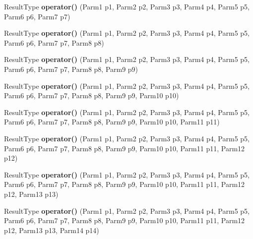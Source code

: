 \begin{DoxyCompactItemize}
\item 
\hypertarget{classLoki_1_1BinderFirst_aba5f845b35044aa6acda02d3429e3ca6}{}Result\+Type {\bfseries operator()} (Parm1 p1, Parm2 p2, Parm3 p3, Parm4 p4, Parm5 p5, Parm6 p6, Parm7 p7)\label{classLoki_1_1BinderFirst_aba5f845b35044aa6acda02d3429e3ca6}

\item 
\hypertarget{classLoki_1_1BinderFirst_ad43e3ee99fa6d9a8243b00c9eeedb912}{}Result\+Type {\bfseries operator()} (Parm1 p1, Parm2 p2, Parm3 p3, Parm4 p4, Parm5 p5, Parm6 p6, Parm7 p7, Parm8 p8)\label{classLoki_1_1BinderFirst_ad43e3ee99fa6d9a8243b00c9eeedb912}

\item 
\hypertarget{classLoki_1_1BinderFirst_a5f30ee929061b055d347fb8ded0df847}{}Result\+Type {\bfseries operator()} (Parm1 p1, Parm2 p2, Parm3 p3, Parm4 p4, Parm5 p5, Parm6 p6, Parm7 p7, Parm8 p8, Parm9 p9)\label{classLoki_1_1BinderFirst_a5f30ee929061b055d347fb8ded0df847}

\item 
\hypertarget{classLoki_1_1BinderFirst_a8cd2e1a523c41198f12e544c1380673e}{}Result\+Type {\bfseries operator()} (Parm1 p1, Parm2 p2, Parm3 p3, Parm4 p4, Parm5 p5, Parm6 p6, Parm7 p7, Parm8 p8, Parm9 p9, Parm10 p10)\label{classLoki_1_1BinderFirst_a8cd2e1a523c41198f12e544c1380673e}

\item 
\hypertarget{classLoki_1_1BinderFirst_aa26bcbbeecc20e82dd2df3c72e05e168}{}Result\+Type {\bfseries operator()} (Parm1 p1, Parm2 p2, Parm3 p3, Parm4 p4, Parm5 p5, Parm6 p6, Parm7 p7, Parm8 p8, Parm9 p9, Parm10 p10, Parm11 p11)\label{classLoki_1_1BinderFirst_aa26bcbbeecc20e82dd2df3c72e05e168}

\item 
\hypertarget{classLoki_1_1BinderFirst_a2b232207dd7dd2ea0aa1260221b712dc}{}Result\+Type {\bfseries operator()} (Parm1 p1, Parm2 p2, Parm3 p3, Parm4 p4, Parm5 p5, Parm6 p6, Parm7 p7, Parm8 p8, Parm9 p9, Parm10 p10, Parm11 p11, Parm12 p12)\label{classLoki_1_1BinderFirst_a2b232207dd7dd2ea0aa1260221b712dc}

\item 
\hypertarget{classLoki_1_1BinderFirst_ac441ca2eb5f42a59f73b245ec741de52}{}Result\+Type {\bfseries operator()} (Parm1 p1, Parm2 p2, Parm3 p3, Parm4 p4, Parm5 p5, Parm6 p6, Parm7 p7, Parm8 p8, Parm9 p9, Parm10 p10, Parm11 p11, Parm12 p12, Parm13 p13)\label{classLoki_1_1BinderFirst_ac441ca2eb5f42a59f73b245ec741de52}

\item 
\hypertarget{classLoki_1_1BinderFirst_a892bad5385634800c5203bc989c0356e}{}Result\+Type {\bfseries operator()} (Parm1 p1, Parm2 p2, Parm3 p3, Parm4 p4, Parm5 p5, Parm6 p6, Parm7 p7, Parm8 p8, Parm9 p9, Parm10 p10, Parm11 p11, Parm12 p12, Parm13 p13, Parm14 p14)\label{classLoki_1_1BinderFirst_a892bad5385634800c5203bc989c0356e}

\end{DoxyCompactItemize}


